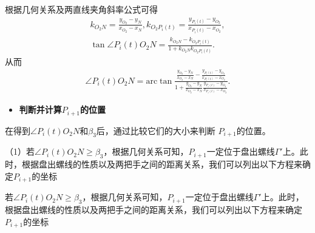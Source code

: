 \documentclass[../main.tex]{subfiles}
\begin{document}
\par 根据几何关系及两直线夹角斜率公式可得
\begin{gather}\label{1.........456}
k_{O_2N}=\frac{y_{O_2}-y_N}{x_{O_2}-x_N},k_{O_2P_i\left( t \right)}=\frac{y_{P_i\left( t \right)}-y_{O_2}}{x_{P_i\left( t \right)}-x_{O_2}},
\\
\tan \angle P_i(t)O_2N=\frac{k_{O_2N}-k_{O_2P_i\left( t \right)}}{1+k_{O_2N}k_{O_2P_i\left( t \right)}}.
\end{gather}
从而
\begin{align}\label{1.........457}
\angle P_i(t)O_2N=\mathrm{arc}\tan \frac{\frac{y_{O_2}-y_N}{x_{O_2}-x_N}-\frac{y_{P_i\left( t \right)}-y_{O_2}}{x_{P_i\left( t \right)}-x_{O_2}}}{1+\frac{y_{O_2}-y_N}{x_{O_2}-x_N}\frac{y_{P_i\left( t \right)}-y_{O_2}}{x_{P_i\left( t \right)}-x_{O_2}}} .
\end{align}
\begin{itemize}
    \item \textbf{判断并计算$P_{i+1}$的位置}
    \end{itemize}
    \par 在得到$\angle P_{i}(t)O_{2}N$和$\beta_{3}$后，通过比较它们的大小来判断 $P_{i + 1} $的位置。
 
    \par （1）若$\angle P_{i}(t)O_{2}N \geq \beta_{3}$，根据几何关系可知，$P_{i + 1}$一定位于盘出螺线$\Gamma'$上。此时，根据盘出螺线的性质以及两把手之间的距离关系，我们可以列出以下方程来确定$ P_{i + 1} $的坐标

\par 若$\angle P_{i}(t)O_{2}N \geq \beta_{3}$，根据几何关系可知，$P_{i + 1}$一定位于盘出螺线$\Gamma'$上。此时，根据盘出螺线的性质以及两把手之间的距离关系，我们可以列出以下方程来确定$ P_{i + 1} $的坐标
\end{document}
